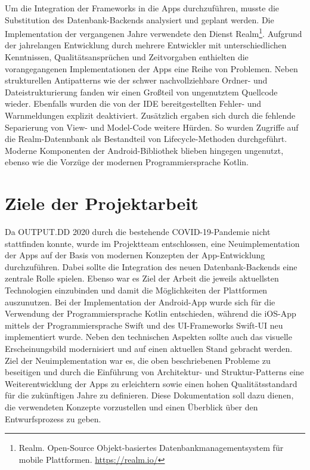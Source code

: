 Um die Integration der Frameworks in die Apps durchzuführen, musste die Substitution des Datenbank-Backends analysiert und geplant werden. Die Implementation der vergangenen Jahre verwendete den Dienst Realm\footnote{Realm. Open-Source Objekt-basiertes Datenbankmanagementsystem für mobile Plattformen. \newline \url{https://realm.io/}}. Aufgrund der jahrelangen Entwicklung durch mehrere Entwickler mit unterschiedlichen Kenntnissen, Qualitätsansprüchen und Zeitvorgaben enthielten die vorangegangenen Implementationen der Apps eine Reihe von Problemen. Neben strukturellen Antipatterns wie der schwer nachvollziehbare Ordner- und Dateistrukturierung fanden wir einen Großteil von ungenutztem Quellcode wieder. Ebenfalls wurden die von der IDE bereitgestellten Fehler- und Warnmeldungen explizit deaktiviert. Zusätzlich ergaben sich durch die fehlende Separierung von View- und Model-Code weitere Hürden. So wurden Zugriffe auf die Realm-Datennbank als Bestandteil von Lifecycle-Methoden durchgeführt. Moderne Komponenten der Android-Bibliothek blieben hingegen ungenutzt, ebenso wie die Vorzüge der modernen Programmiersprache Kotlin.    

\section{Ziele der Projektarbeit}

Da OUTPUT.DD 2020 durch die bestehende COVID-19-Pandemie nicht stattfinden konnte, wurde im Projektteam entschlossen, eine Neuimplementation der Apps auf der Basis von modernen Konzepten der App-Entwicklung durchzuführen. Dabei sollte die Integration des neuen Datenbank-Backends eine zentrale Rolle spielen. Ebenso war es Ziel der Arbeit die jeweils aktuellsten Technologien einzubinden und damit die Möglichkeiten der Plattformen auszunutzen. Bei der Implementation der Android-App wurde sich für die Verwendung der Programmiersprache Kotlin entschieden, während die iOS-App mittels der Programmiersprache Swift und des UI-Frameworks Swift-UI neu implementiert wurde. Neben den technischen Aspekten sollte auch das visuelle Erscheinungsbild modernisiert und auf einen aktuellen Stand gebracht werden. Ziel der Neuimplementation war es, die oben beschriebenen Probleme zu beseitigen und durch die Einführung von Architektur- und Struktur-Patterns eine Weiterentwicklung der Apps zu erleichtern sowie einen hohen Qualitätsstandard für die zukünftigen Jahre zu definieren. Diese Dokumentation soll dazu dienen, die verwendeten Konzepte vorzustellen und einen Überblick über den Entwurfsprozess zu geben.
